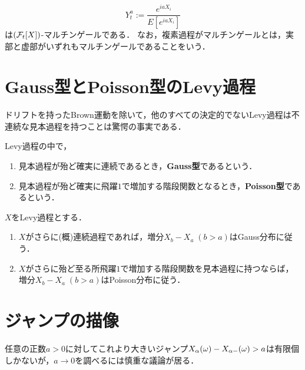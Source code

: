 \documentclass[uplatex,dvipdfmx]{jsreport}
\begin{document}
\begin{proposition}
    \[Y^a_t:=\frac{e^{iaX_i}}{E[e^{iaX_i}]}\]
    は$(\mathcal{F}_t[X])$-マルチンゲールである．
    なお，複素過程がマルチンゲールとは，実部と虚部がいずれもマルチンゲールであることをいう．
\end{proposition}

\section{Gauss型とPoisson型のLevy過程}

\begin{tcolorbox}[colframe=ForestGreen, colback=ForestGreen!10!white,breakable,colbacktitle=ForestGreen!40!white,coltitle=black,fonttitle=\bfseries\sffamily,
title=]
    ドリフトを持ったBrown運動を除いて，他のすべての決定的でないLevy過程は不連続な見本過程を持つことは驚愕の事実である．
\end{tcolorbox}

\begin{definition}
    Levy過程の中で，
    \begin{enumerate}
        \item 見本過程が殆ど確実に連続であるとき，\textbf{Gauss型}であるという．
        \item 見本過程が殆ど確実に飛躍$1$で増加する階段関数となるとき，\textbf{Poisson型}であるという．
    \end{enumerate}
\end{definition}

\begin{theorem}[Gauss型とPoisson型Levy過程]
    $X$をLevy過程とする．
    \begin{enumerate}
        \item $X$がさらに(概)連続過程であれば，増分$X_b-X_a\;(b>a)$はGauss分布に従う．
        \item $X$がさらに殆ど至る所飛躍$1$で増加する階段関数を見本過程に持つならば，増分$X_b-X_a\;(b>a)$はPoisson分布に従う．
    \end{enumerate}
\end{theorem}

\section{ジャンプの描像}

\begin{tcolorbox}[colframe=ForestGreen, colback=ForestGreen!10!white,breakable,colbacktitle=ForestGreen!40!white,coltitle=black,fonttitle=\bfseries\sffamily,
title=]
    任意の正数$a>0$に対してこれより大きいジャンプ$X_\alpha(\omega)-X_{\alpha-}(\omega)>a$は有限個しかないが，$a\to0$を調べるには慎重な議論が居る．
\end{tcolorbox}
\end{document}
